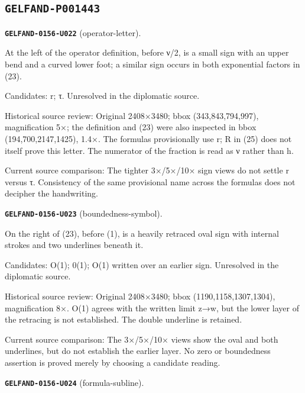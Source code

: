 \subsection*{\texttt{GELFAND-P001443}}
\par\noindent\leavevmode{}\label{GELFAND-0156-U022}\label{GELFAND-P001443:operator-letter}\textbf{\texttt{GELFAND-0156-U022}} (operator-letter).\nopagebreak[4]\par
At the left of the operator definition, before ν/2, is a small sign with an upper bend and a curved lower foot; a similar sign occurs in both exponential factors in (23).\par
Candidates: r; τ. Unresolved in the diplomatic source.\par
Historical source review: Original 2408×3480; bbox (343,843,794,997), magnification 5×; the definition and (23) were also inspected in bbox (194,700,2147,1425), 1.4×. The formulas provisionally use r; R in (25) does not itself prove this letter. The numerator of the fraction is read as ν rather than h.\par
Current source comparison: The tighter 3×/5×/10× sign views do not settle r versus τ. Consistency of the same provisional name across the formulas does not decipher the handwriting.\par\medskip
\par\noindent\leavevmode{}\label{GELFAND-0156-U023}\label{GELFAND-P001443:boundedness-symbol}\textbf{\texttt{GELFAND-0156-U023}} (boundedness-symbol).\nopagebreak[4]\par
On the right of (23), before (1), is a heavily retraced oval sign with internal strokes and two underlines beneath it.\par
Candidates: O(1); 0(1); O(1) written over an earlier sign. Unresolved in the diplomatic source.\par
Historical source review: Original 2408×3480; bbox (1190,1158,1307,1304), magnification 8×. O(1) agrees with the written limit z→w, but the lower layer of the retracing is not established. The double underline is retained.\par
Current source comparison: The 3×/5×/10× views show the oval and both underlines, but do not establish the earlier layer. No zero or boundedness assertion is proved merely by choosing a candidate reading.\par\medskip
\par\noindent\leavevmode{}\label{GELFAND-0156-U024}\label{GELFAND-P001443:formula-subline}\textbf{\texttt{GELFAND-0156-U024}} (formula-subline).\nopagebreak[4]\par
